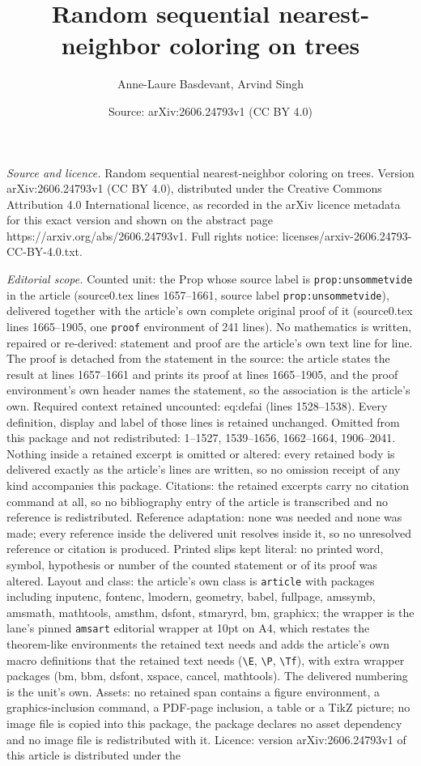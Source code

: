 \documentclass[10pt,a4paper]{amsart}
\title[Random sequential nearest-neighbor coloring on trees]{Random sequential nearest-neighbor coloring on trees}
\author{Anne-Laure Basdevant, Arvind Singh}
\date{Source: arXiv:2606.24793v1 (CC BY 4.0)}
\begin{document}
\maketitle

\noindent\emph{Source and licence.} Random sequential nearest-neighbor coloring on trees. Version arXiv:2606.24793v1 (CC BY 4.0), distributed under the Creative Commons Attribution 4.0 International licence, as recorded in the arXiv licence metadata for this exact version and shown on the abstract page https://arxiv.org/abs/2606.24793v1. Full rights notice: licenses/arxiv-2606.24793-CC-BY-4.0.txt.\par\smallskip

\noindent\textit{Editorial scope.} Counted unit: the Prop whose source label is \texttt{prop:unsommetvide} in the article (source0.tex lines 1657--1661, source label \texttt{prop:unsommetvide}), delivered together with the article's own complete original proof of it (source0.tex lines 1665--1905, one \texttt{proof} environment of 241 lines). No mathematics is written, repaired or re-derived: statement and proof are the article's own text line for line. The proof is detached from the statement in the source: the article states the result at lines 1657--1661 and prints its proof at lines 1665--1905, and the proof environment's own header names the statement, so the association is the article's own. Required context retained uncounted: eq:defai (lines 1528--1538). Every definition, display and label of those lines is retained unchanged. Omitted from this package and not redistributed: 1--1527, 1539--1656, 1662--1664, 1906--2041. Nothing inside a retained excerpt is omitted or altered: every retained body is delivered exactly as the article's lines are written, so no omission receipt of any kind accompanies this package. Citations: the retained excerpts carry no citation command at all, so no bibliography entry of the article is transcribed and no reference is redistributed. Reference adaptation: none was needed and none was made; every reference inside the delivered unit resolves inside it, so no unresolved reference or citation is produced. Printed slips kept literal: no printed word, symbol, hypothesis or number of the counted statement or of its proof was altered. Layout and class: the article's own class is \texttt{article} with packages including inputenc, fontenc, lmodern, geometry, babel, fullpage, amssymb, amsmath, mathtools, amsthm, dsfont, stmaryrd, bm, graphicx; the wrapper is the lane's pinned \texttt{amsart} editorial wrapper at 10pt on A4, which restates the theorem-like environments the retained text needs and adds the article's own macro definitions that the retained text needs (\texttt{\textbackslash E}, \texttt{\textbackslash P}, \texttt{\textbackslash Tf}), with extra wrapper packages (bm, bbm, dsfont, xspace, cancel, mathtools). The delivered numbering is the unit's own. Assets: no retained span contains a figure environment, a graphics-inclusion command, a PDF-page inclusion, a table or a TikZ picture; no image file is copied into this package, the package declares no asset dependency and no image file is redistributed with it. Licence: version arXiv:2606.24793v1 of this article is distributed under the 
\end{document}
